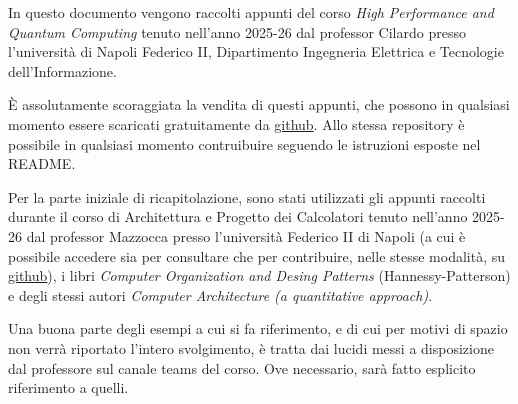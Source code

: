 In questo documento vengono raccolti appunti del corso \textit{High Performance and Quantum Computing} tenuto nell'anno 2025-26 dal professor Cilardo presso l'università di Napoli Federico II, Dipartimento Ingegneria Elettrica e Tecnologie dell'Informazione.

\noindent \uppercase{è} assolutamente scoraggiata la vendita di questi appunti, che possono in qualsiasi momento essere scaricati gratuitamente da \href{https://github.com/h-tajato/hpqc_notes}{github}. Allo stessa repository è possibile in qualsiasi momento contruibuire seguendo le istruzioni esposte nel README.

\noindent Per la parte iniziale di ricapitolazione, sono stati utilizzati gli appunti raccolti durante il corso di Architettura e Progetto dei Calcolatori tenuto nell'anno 2025-26 dal professor Mazzocca presso l'università Federico II di Napoli (a cui è possibile accedere sia per consultare che per contribuire, nelle stesse modalità, su \href{https://github.com/Agda78/APC-appunti}{github}), i libri \textit{Computer Organization and Desing Patterns} (Hannessy-Patterson) e degli stessi autori \textit{Computer Architecture (a quantitative approach)}.

\noindent Una buona parte degli esempi a cui si fa riferimento, e di cui per motivi di spazio non verrà riportato l'intero svolgimento, è tratta dai lucidi messi a disposizione dal professore sul canale teams del corso. Ove necessario, sarà fatto esplicito riferimento a quelli. 
